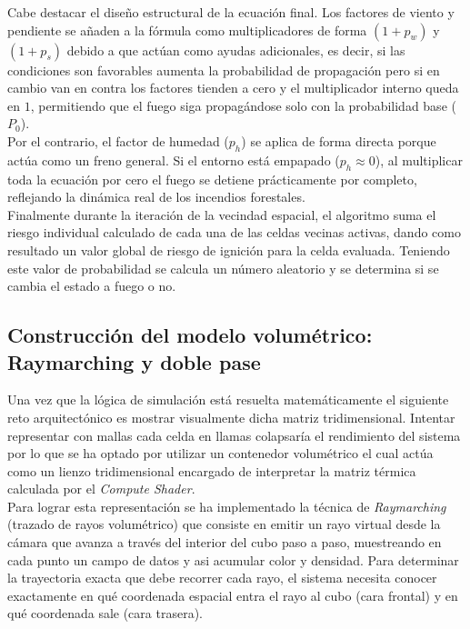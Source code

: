             Cabe destacar el diseño estructural de la ecuación final. Los factores de viento y pendiente se añaden a la fórmula como multiplicadores de forma $(1 + p_w)$ y $(1 + p_s)$ debido a que actúan como ayudas adicionales, es decir, si las condiciones son favorables aumenta la probabilidad de propagación pero si en cambio van en contra los factores tienden a cero y el multiplicador interno queda en $1$, permitiendo que el fuego siga propagándose solo con la probabilidad base ($P_0$). \\
            
            Por el contrario, el factor de humedad ($p_h$) se aplica de forma directa porque actúa como un freno general. Si el entorno está empapado ($p_h \approx 0$), al multiplicar toda la ecuación por cero el fuego se detiene prácticamente por completo, reflejando la dinámica real de los incendios forestales.\\

            Finalmente durante la iteración de la vecindad espacial, el algoritmo suma el riesgo individual calculado de cada una de las celdas vecinas activas, dando como resultado un valor global de riesgo de ignición para la celda evaluada. Teniendo este valor de probabilidad se calcula un número aleatorio y se determina si se cambia el estado a fuego o no.\\
    
    \subsection[Visualización]{Construcción del modelo volumétrico: Raymarching y doble pase}

        Una vez que la lógica de simulación está resuelta matemáticamente el siguiente reto arquitectónico es mostrar visualmente dicha matriz tridimensional. Intentar representar con mallas cada celda en llamas colapsaría el rendimiento del sistema por lo que se ha optado por utilizar un contenedor volumétrico el cual actúa como un lienzo tridimensional encargado de interpretar la matriz térmica calculada por el \textit{Compute Shader}.\\

        Para lograr esta representación se ha implementado la técnica de \textit{Raymarching} (trazado de rayos volumétrico) que consiste en emitir un rayo virtual desde la cámara que avanza a través del interior del cubo paso a paso, muestreando en cada punto un campo de datos y asi acumular color y densidad. Para determinar la trayectoria exacta que debe recorrer cada rayo, el sistema necesita conocer exactamente en qué coordenada espacial entra el rayo al cubo (cara frontal) y en qué coordenada sale (cara trasera)\cite{gpugems3_ch30}.\\
       
